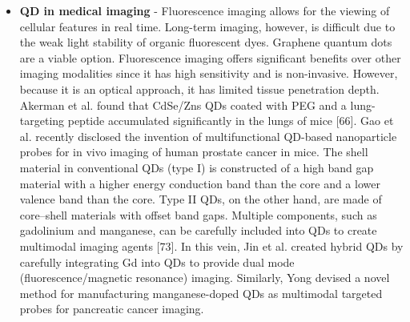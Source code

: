 \documentclass[12pt]{article}
\begin{document}
\begin{itemize}
\item \textbf{QD in medical imaging } - Fluorescence imaging allows for the viewing of cellular features in real time. Long-term imaging, however, is difficult due to the weak light stability of organic fluorescent dyes. Graphene quantum dots are a viable option. Fluorescence imaging offers significant benefits over other imaging modalities since it has high sensitivity and is non-invasive. However, because it is an optical approach, it has limited tissue penetration depth. Akerman et al. found that CdSe/Zns QDs coated with PEG and a lung-targeting peptide accumulated significantly in the lungs of mice [66].
Gao et al. recently disclosed the invention of multifunctional QD-based nanoparticle probes for in vivo imaging of human prostate cancer in mice. The shell material in conventional QDs (type I) is constructed of a high band gap material with a higher energy conduction band than the core and a lower valence band than the core. Type II QDs, on the other hand, are made of core–shell materials with offset band gaps. Multiple components, such as gadolinium and manganese, can be carefully included into QDs to create multimodal imaging agents [73]. In this vein, Jin et al. created hybrid QDs by carefully integrating Gd into QDs to provide dual mode (fluorescence/magnetic resonance) imaging. Similarly, Yong devised a novel method for manufacturing manganese-doped QDs as multimodal targeted probes for pancreatic cancer imaging.
\end{itemize}
\end{document}
